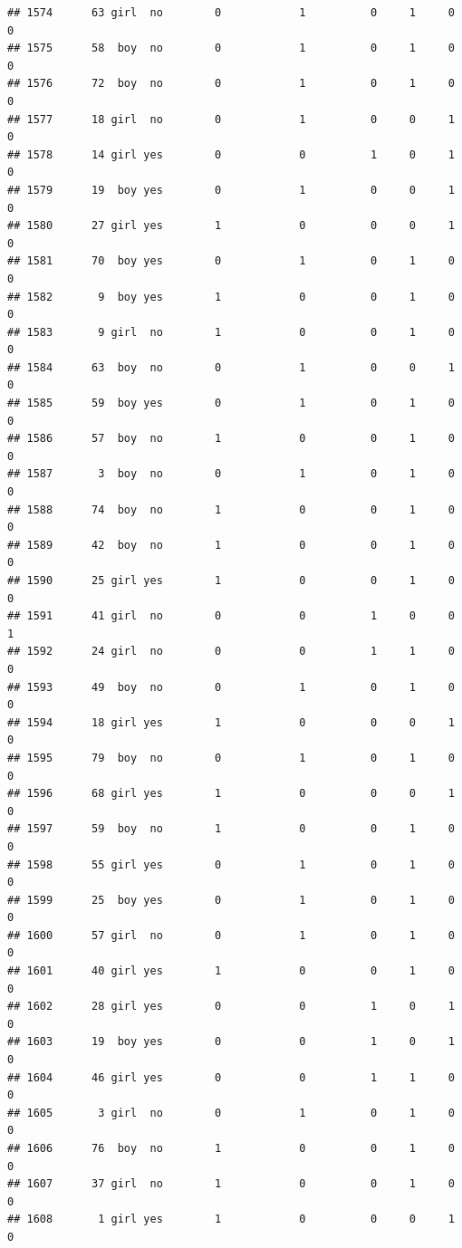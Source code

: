 \documentclass[man]{apa6}
\begin{document}
\begin{verbatim}
## 1574      63 girl  no        0            1          0     1     0     0
## 1575      58  boy  no        0            1          0     1     0     0
## 1576      72  boy  no        0            1          0     1     0     0
## 1577      18 girl  no        0            1          0     0     1     0
## 1578      14 girl yes        0            0          1     0     1     0
## 1579      19  boy yes        0            1          0     0     1     0
## 1580      27 girl yes        1            0          0     0     1     0
## 1581      70  boy yes        0            1          0     1     0     0
## 1582       9  boy yes        1            0          0     1     0     0
## 1583       9 girl  no        1            0          0     1     0     0
## 1584      63  boy  no        0            1          0     0     1     0
## 1585      59  boy yes        0            1          0     1     0     0
## 1586      57  boy  no        1            0          0     1     0     0
## 1587       3  boy  no        0            1          0     1     0     0
## 1588      74  boy  no        1            0          0     1     0     0
## 1589      42  boy  no        1            0          0     1     0     0
## 1590      25 girl yes        1            0          0     1     0     0
## 1591      41 girl  no        0            0          1     0     0     1
## 1592      24 girl  no        0            0          1     1     0     0
## 1593      49  boy  no        0            1          0     1     0     0
## 1594      18 girl yes        1            0          0     0     1     0
## 1595      79  boy  no        0            1          0     1     0     0
## 1596      68 girl yes        1            0          0     0     1     0
## 1597      59  boy  no        1            0          0     1     0     0
## 1598      55 girl yes        0            1          0     1     0     0
## 1599      25  boy yes        0            1          0     1     0     0
## 1600      57 girl  no        0            1          0     1     0     0
## 1601      40 girl yes        1            0          0     1     0     0
## 1602      28 girl yes        0            0          1     0     1     0
## 1603      19  boy yes        0            0          1     0     1     0
## 1604      46 girl yes        0            0          1     1     0     0
## 1605       3 girl  no        0            1          0     1     0     0
## 1606      76  boy  no        1            0          0     1     0     0
## 1607      37 girl  no        1            0          0     1     0     0
## 1608       1 girl yes        1            0          0     0     1     0

\end{verbatim}
\end{document}
